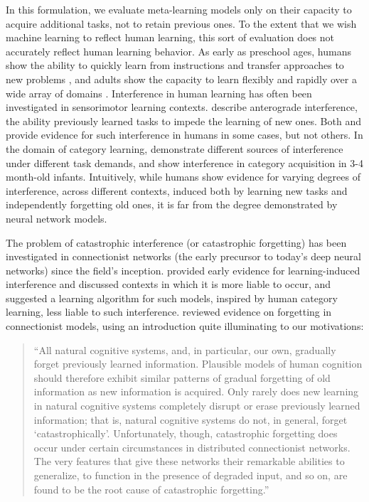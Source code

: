 In this formulation, we evaluate meta-learning models only on their capacity to acquire additional tasks, not to retain previous ones. To the extent that we wish machine learning to reflect human learning, this sort of evaluation does not accurately reflect human learning behavior. As early as preschool ages, humans show the ability to quickly learn from instructions and transfer approaches to new problems \parencite{Brown1988a}, and adults show the capacity to learn flexibly and rapidly over a wide array of domains \parencite{Green2008}. Interference in human learning has often been investigated in sensorimotor learning contexts. \textcite{Krakauer2011} describe anterograde interference, the ability previously learned tasks to impede the learning of new ones. Both \textcite{Shadmehr1994} and \textcite{Brashers-Krug1994} provide evidence for such interference in humans in some cases, but not others. In the domain of category learning, \textcite{Waldron2001} demonstrate different sources of interference under different task demands, and \textcite{Mareschal2002} show interference in category acquisition in 3-4 month-old infants. Intuitively, while humans show evidence for varying degrees of interference, across different contexts, induced both by learning new tasks and independently forgetting old ones, it is far from the degree demonstrated by neural network models. 

The problem of catastrophic interference (or catastrophic forgetting) has been investigated in connectionist networks (the early precursor to today's deep neural networks) since the field's inception. \textcite{McCloskey1989} provided early evidence for learning-induced interference and discussed contexts in which it is more liable to occur, and \textcite{Kruschke1993} suggested a learning algorithm for such models, inspired by human category learning, less liable to such interference. \textcite{French1999} reviewed evidence on forgetting in connectionist models, using an introduction quite illuminating to our motivations:
\begin{quote} \onehalfspacing
``All natural cognitive systems, and, in particular, our own, gradually forget previously learned information. Plausible models of human cognition should therefore exhibit similar patterns of gradual forgetting of old information as new information is acquired. Only rarely does new learning in natural cognitive systems completely disrupt or erase previously learned information; that is, natural cognitive systems do not, in general, forget ‘catastrophically'. Unfortunately, though, catastrophic forgetting does occur under certain circumstances in distributed connectionist networks. The very features that give these networks their remarkable abilities to generalize, to function in the presence of degraded input, and so on, are found to be the root cause of catastrophic forgetting.'' 
\end{quote}

